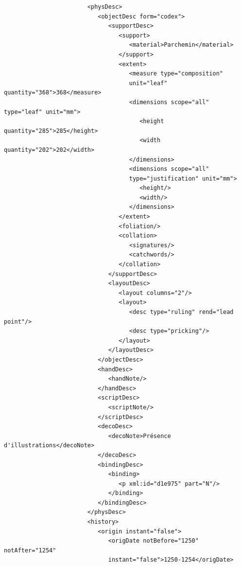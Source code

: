 \documentclass[a4paper,12pt,twoside]{book}
\begin{document}
\begin{verbatim}
                        <physDesc>
                           <objectDesc form="codex">
                              <supportDesc>
                                 <support>
                                    <material>Parchemin</material>
                                 </support>
                                 <extent>
                                    <measure type="composition" 
                                    unit="leaf" quantity="368">368</measure>
                                    <dimensions scope="all" type="leaf" unit="mm">
                                       <height quantity="285">285</height>
                                       <width quantity="202">202</width>
                                    </dimensions>
                                    <dimensions scope="all" 
                                    type="justification" unit="mm">
                                       <height/>
                                       <width/>
                                    </dimensions>
                                 </extent>
                                 <foliation/>
                                 <collation>
                                    <signatures/>
                                    <catchwords/>
                                 </collation>
                              </supportDesc>
                              <layoutDesc>
                                 <layout columns="2"/>
                                 <layout>
                                    <desc type="ruling" rend="lead point"/>
                                    <desc type="pricking"/>
                                 </layout>
                              </layoutDesc>
                           </objectDesc>
                           <handDesc>
                              <handNote/>
                           </handDesc>
                           <scriptDesc>
                              <scriptNote/>
                           </scriptDesc>
                           <decoDesc>
                              <decoNote>Présence d'illustrations</decoNote>
                           </decoDesc>
                           <bindingDesc>
                              <binding>
                                 <p xml:id="d1e975" part="N"/>
                              </binding>
                           </bindingDesc>
                        </physDesc>
                        <history>
                           <origin instant="false">
                              <origDate notBefore="1250" notAfter="1254" 
                              instant="false">1250-1254</origDate>

\end{verbatim}
\end{document}
